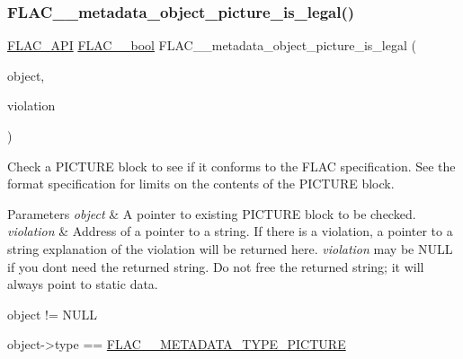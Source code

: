 \subsubsection{\texorpdfstring{F\+L\+A\+C\+\_\+\+\_\+metadata\+\_\+object\+\_\+picture\+\_\+is\+\_\+legal()}{FLAC\_\_metadata\_object\_picture\_is\_legal()}}
{\footnotesize\ttfamily \hyperlink{group__flac__export_ga56ca07df8a23310707732b1c0007d6f5}{F\+L\+A\+C\+\_\+\+A\+PI} \hyperlink{ordinals_8h_a95103469f1cbd78b8cf250194985b34e}{F\+L\+A\+C\+\_\+\+\_\+bool} F\+L\+A\+C\+\_\+\+\_\+metadata\+\_\+object\+\_\+picture\+\_\+is\+\_\+legal (\begin{DoxyParamCaption}\item[{\hyperlink{zconf_8h_a2c212835823e3c54a8ab6d95c652660e}{const} \hyperlink{struct_f_l_a_c_____stream_metadata}{F\+L\+A\+C\+\_\+\+\_\+\+Stream\+Metadata} $\ast$}]{object,  }\item[{\hyperlink{zconf_8h_a2c212835823e3c54a8ab6d95c652660e}{const} char $\ast$$\ast$}]{violation }\end{DoxyParamCaption})}

Check a P\+I\+C\+T\+U\+RE block to see if it conforms to the F\+L\+AC specification. See the format specification for limits on the contents of the P\+I\+C\+T\+U\+RE block.


\begin{DoxyParams}{Parameters}
{\em object} & A pointer to existing P\+I\+C\+T\+U\+RE block to be checked. \\
\hline
{\em violation} & Address of a pointer to a string. If there is a violation, a pointer to a string explanation of the violation will be returned here. {\itshape violation} may be {\ttfamily N\+U\+LL} if you don\textquotesingle{}t need the returned string. Do not free the returned string; it will always point to static data.  
\begin{DoxyCode}
\textcolor{keywordtype}{object} != NULL 
\end{DoxyCode}
 
\begin{DoxyCode}
\textcolor{keywordtype}{object}->type == \hyperlink{group__flac__format_ggac71714ba8ddbbd66d26bb78a427fac01acf28ae2788366617c1aeab81d5961c6e}{FLAC\_\_METADATA\_TYPE\_PICTURE} 
\end{DoxyCode}
 \\
\hline
\end{DoxyParams}

